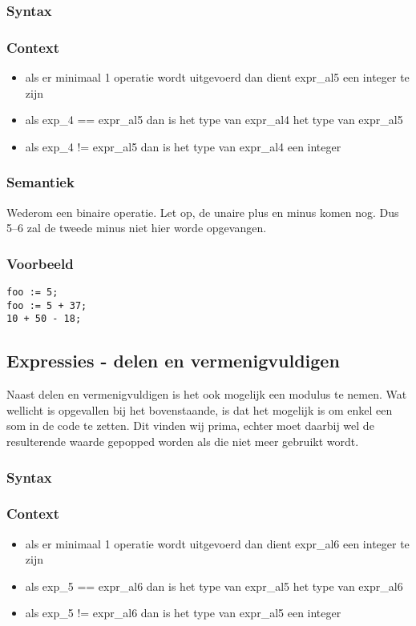 \documentclass[]{article}
\begin{document}
\subsubsection{Syntax}

\subsubsection{Context}
\begin{itemize}
\item als er minimaal 1 operatie wordt uitgevoerd dan dient expr\_al5 een integer te zijn
\item als exp\_4 == expr\_al5 dan is het type van expr\_al4 het type van expr\_al5
\item als exp\_4 != expr\_al5 dan is het type van expr\_al4 een integer
\end{itemize}
\subsubsection{Semantiek}
Wederom een binaire operatie. Let op, de unaire plus en minus komen nog. Dus 5--6 zal de tweede minus niet hier worde opgevangen.
\subsubsection{Voorbeeld}
\begin{lstlisting}[style=SELMA]
foo := 5;
foo := 5 + 37;
10 + 50 - 18;
\end{lstlisting}

\subsection{Expressies - delen en vermenigvuldigen}
Naast delen en vermenigvuldigen is het ook mogelijk een modulus te nemen.
Wat wellicht is opgevallen bij het bovenstaande, is dat het mogelijk is om enkel een som in de code te zetten. Dit vinden wij prima, echter moet daarbij wel de resulterende waarde gepopped worden als die niet meer gebruikt wordt.
\subsubsection{Syntax}

\subsubsection{Context}
\begin{itemize}
\item als er minimaal 1 operatie wordt uitgevoerd dan dient expr\_al6 een integer te zijn
\item als exp\_5 == expr\_al6 dan is het type van expr\_al5 het type van expr\_al6
\item als exp\_5 != expr\_al6 dan is het type van expr\_al5 een integer
\end{itemize}
\end{document}
